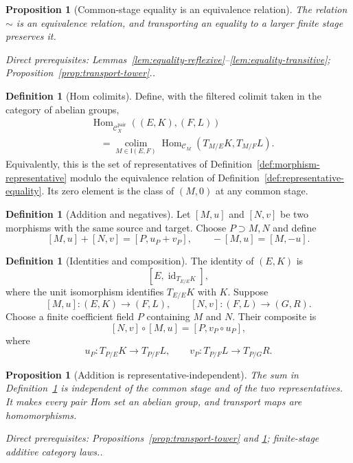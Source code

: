 \documentclass[10pt]{article}
\newtheorem{proposition}[theorem]{Proposition}
\theoremstyle{definition}
\newtheorem{definition}[theorem]{Definition}
\newcommand{\Hom}{\operatorname{Hom}}
\newcommand{\Pair}{\mathcal C_X^{\mathrm{pair}}}
\newcommand{\depends}[1]{\par\smallskip\noindent\textit{Direct prerequisites:} #1.}
\begin{document}
\begin{proposition}[Common-stage equality is an equivalence relation]
\label{prop:equality-equivalence}
The relation $\sim$ is an equivalence relation, and transporting an equality
to a larger finite stage preserves it.
\depends{Lemmas~\ref{lem:equality-reflexive}--\ref{lem:equality-transitive};
Proposition~\ref{prop:transport-tower}.}
\end{proposition}

\begin{definition}[Hom colimits]\label{def:pair-hom}
Define, with the filtered colimit taken in the category of abelian groups,
\[
\begin{aligned}
 &\Hom_{\Pair}((E,K),(F,L))\\
 &\quad=
 \operatorname*{colim}_{M\in\mathsf I(E,F)}
 \Hom_{\mathcal C_M}(T_{M/E}K,T_{M/F}L).
\end{aligned}
\]
Equivalently, this is the set of representatives of
Definition~\ref{def:morphism-representative} modulo the equivalence relation
of Definition~\ref{def:representative-equality}.  Its zero element is the
class of $(M,0)$ at any common stage.
\end{definition}

\begin{definition}[Addition and negatives]\label{def:pair-addition}
Let $[M,u]$ and $[N,v]$ be two morphisms with the same source and target.
Choose $P\supset M,N$ and define
\[
 [M,u]+[N,v]=[P,u_P+v_P],
 \qquad -[M,u]=[M,-u].
\]
\end{definition}

\begin{definition}[Identities and composition]\label{def:pair-composition}
The identity of $(E,K)$ is
\[
 [E,\operatorname{id}_{T_{E/E}K}],
\]
where the unit isomorphism identifies $T_{E/E}K$ with $K$.  Suppose
\[
 [M,u]:(E,K)\longrightarrow(F,L),
 \qquad
 [N,v]:(F,L)\longrightarrow(G,R).
\]
Choose a finite coefficient field $P$ containing $M$ and $N$.  Their composite is
\[
 [N,v]\circ[M,u]=[P,v_P\circ u_P],
\]
where
\[
 u_P:T_{P/E}K\to T_{P/F}L,\qquad
 v_P:T_{P/F}L\to T_{P/G}R.
\]
\end{definition}

\begin{proposition}[Addition is representative-independent]
\label{prop:addition-well-defined}
The sum in Definition~\ref{def:pair-addition} is independent of the common
stage and of the two representatives.  It makes every pair Hom set an
abelian group, and transport maps are homomorphisms.
\depends{Propositions~\ref{prop:transport-tower} and
\ref{prop:equality-equivalence}; finite-stage additive category laws.}
\end{proposition}
\end{document}
